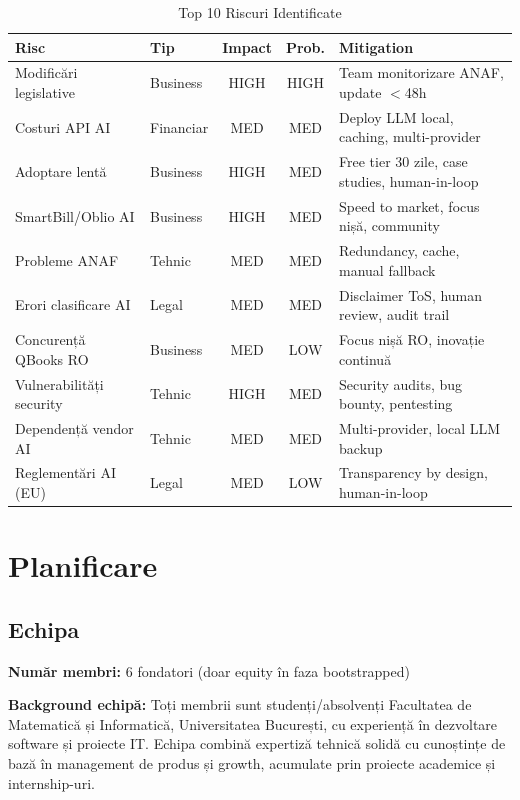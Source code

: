 \documentclass[11pt,a4paper]{article}
\begin{document}
\begin{table}[H]
\centering
\small
\begin{tabularx}{\textwidth}{|l|l|c|c|X|}
\hline
\rowcolor{lightgray}
\textbf{Risc} & \textbf{Tip} & \textbf{Impact} & \textbf{Prob.} & \textbf{Mitigation} \\
\hline
Modificări legislative & Business & HIGH & HIGH & Team monitorizare ANAF, update $<$48h \\
\hline
Costuri API AI & Financiar & MED & MED & Deploy LLM local, caching, multi-provider \\
\hline
Adoptare lentă & Business & HIGH & MED & Free tier 30 zile, case studies, human-in-loop \\
\hline
SmartBill/Oblio AI & Business & HIGH & MED & Speed to market, focus nișă, community \\
\hline
Probleme ANAF & Tehnic & MED & MED & Redundancy, cache, manual fallback \\
\hline
Erori clasificare AI & Legal & MED & MED & Disclaimer ToS, human review, audit trail \\
\hline
Concurență QBooks RO & Business & MED & LOW & Focus nișă RO, inovație continuă \\
\hline
Vulnerabilități security & Tehnic & HIGH & MED & Security audits, bug bounty, pentesting \\
\hline
Dependență vendor AI & Tehnic & MED & MED & Multi-provider, local LLM backup \\
\hline
Reglementări AI (EU) & Legal & MED & LOW & Transparency by design, human-in-loop \\
\hline
\end{tabularx}
\caption{Top 10 Riscuri Identificate}
\end{table}

\section{Planificare}

\subsection{Echipa}

\textbf{Număr membri:} 6 fondatori (doar equity în faza bootstrapped)

\textbf{Background echipă:} Toți membrii sunt studenți/absolvenți Facultatea de Matematică și Informatică, Universitatea București, cu experiență în dezvoltare software și proiecte IT. Echipa combină expertiză tehnică solidă cu cunoștințe de bază în management de produs și growth, acumulate prin proiecte academice și internship-uri.
\end{document}
